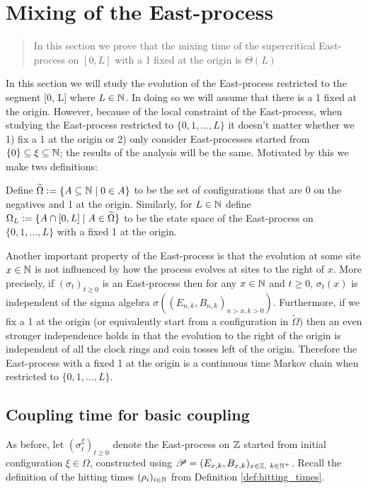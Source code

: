 \section{Mixing of the East-process}
\begin{quote}
{\small In this section we prove that the mixing time of the supercritical East-process on $[0, L]$ with a 1 fixed at the origin is $\Theta(L)$}
\end{quote}

In this section we will study the evolution of the East-process restricted to the segment [0, L] where $L \in \mathbb{N}$. In doing so we will assume that there is a 1 fixed at the origin. However, because of the local constraint of the East-process, when studying the East-process restricted to $\{0, 1, ..., L\}$ it doesn't matter whether we 1) fix a 1 at the origin or 2) only consider East-processes started from $\{0\} \subseteq \xi \subseteq \mathbb{N}$; the results of the analysis will be the same. Motivated by this we make two definitions:

\begin{definition}
Define $\widetilde{\Omega} \vcentcolon= \{A \subseteq \mathbb{N} \mid 0 \in A \}$ to be the set of configurations that are 0 on the negatives and 1 at the origin. Similarly, for $L \in \mathbb{N}$ define $\Omega_L \vcentcolon= \{ A \cap [0, L] \mid A \in \widetilde{\Omega} \}$ to be the state space of the East-process on $\{0, 1, ..., L\}$ with a fixed 1 at the origin. 
\end{definition}

Another important property of the East-process is that the evolution at some site $x \in \mathbb{N}$ is not influenced by how the process evolves at sites to the right of $x$. More precisely, if $(\sigma_t)_{t \geq 0}$ is an East-process then for any $x \in \mathbb{N}$ and $t \geq 0$, $\sigma_t (x)$ is independent of the sigma algebra $\sigma \left( (E_{n,k}, B_{n,k})_{n > x, k > 0}\right)$. Furthermore, if we fix a 1 at the origin (or equivalently start from a configuration in $\widetilde{\Omega}$) then an even stronger independence holds in that the evolution to the right of the origin is independent of all the clock rings and coin tosses left of the origin. Therefore the East-process with a fixed 1 at the origin is a continuous time Markov chain when restricted to $\{0, 1, ..., L\}$. 

\subsection{Coupling time for basic coupling}
As before, let $(\sigma^\xi_t)_{t \geq 0}$ denote the East-process on $\mathbb{Z}$ started from initial configuration $\xi \in \Omega$, constructed using $\mathscr{P} = (E_{x,k}, B_{x,k})_{x \in \mathbb{Z},\ k \in \mathbb{N}^+}$. Recall the definition of the hitting times $(\rho_i)_{i \in \mathbb{N}}$ from Definition \ref{def:hitting_times}.  



